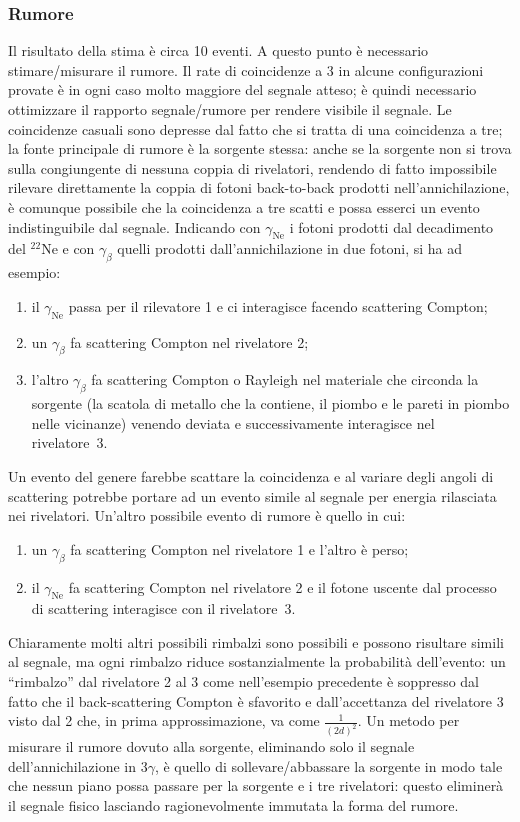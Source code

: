 \subsubsection{Rumore}
Il risultato della stima è circa 10 eventi. A questo punto è necessario stimare/misurare il rumore.
Il rate di coincidenze a 3 in alcune configurazioni provate è in ogni caso molto maggiore del segnale atteso; è quindi necessario ottimizzare il rapporto segnale/rumore per rendere visibile il segnale.
Le coincidenze casuali sono depresse dal fatto che si tratta di una coincidenza a tre; la fonte principale di rumore è la sorgente stessa: 
anche se la sorgente non si trova sulla congiungente di nessuna coppia di rivelatori, rendendo di fatto impossibile rilevare direttamente la coppia di fotoni back-to-back prodotti nell'annichilazione, è comunque possibile che la coincidenza a tre scatti e possa esserci un evento indistinguibile dal segnale.
Indicando con $\gamma_{\text{Ne}}$ i fotoni prodotti dal decadimento del $^{22}\text{Ne}$ e con $\gamma_{\beta}$ quelli prodotti dall'annichilazione in due fotoni, si ha ad esempio:
\begin{enumerate}
	\item il $\gamma_{\text{Ne}}$ passa per il rilevatore 1 e ci interagisce facendo scattering Compton;
	\item un $\gamma_{\beta}$ fa scattering Compton nel rivelatore 2;
	\item l'altro $\gamma_{\beta}$ fa scattering Compton o Rayleigh nel materiale che circonda la sorgente (la scatola di metallo che la contiene, il piombo e le pareti in piombo nelle vicinanze) venendo deviata e successivamente interagisce nel rivelatore~3.
\end{enumerate}
Un evento del genere farebbe scattare la coincidenza e al variare degli angoli di scattering potrebbe portare ad un evento simile al segnale per energia rilasciata nei rivelatori. Un'altro possibile evento di rumore è quello in cui:
\begin{enumerate}
	\item un $\gamma_{\beta}$ fa scattering Compton nel rivelatore 1 e l'altro è perso;
	\item il $\gamma_{\text{Ne}}$ fa scattering Compton nel rivelatore 2 e il fotone uscente dal processo di scattering interagisce con il rivelatore~3.
\end{enumerate}
Chiaramente molti altri possibili rimbalzi sono possibili e possono risultare simili al segnale, ma ogni rimbalzo riduce sostanzialmente la probabilità dell'evento: un ``rimbalzo'' dal rivelatore 2 al 3 come nell'esempio precedente è soppresso dal fatto che il back-scattering Compton è sfavorito e dall'accettanza del rivelatore 3 visto dal 2 che, in prima approssimazione, va come $\frac{1}{(2d)^2}$.
Un metodo per misurare il rumore dovuto alla sorgente, eliminando solo il segnale dell'annichilazione in $3\gamma$, è quello di sollevare/abbassare la sorgente in modo tale che nessun piano possa passare per la sorgente e i tre rivelatori: questo eliminerà il segnale fisico lasciando ragionevolmente immutata la forma del rumore.
